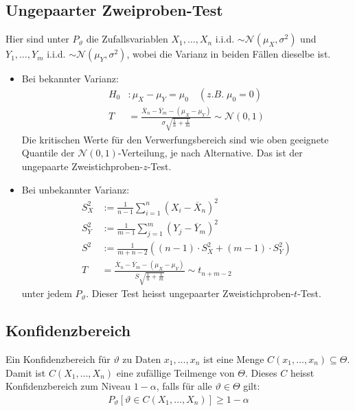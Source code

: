 \documentclass[8pt]{extarticle}
\newcommand{\vt}{\vartheta}
\newcommand{\Sn}{\sum_{i = 1}^n}
\newcommand{\zufallsvariablen}{X_1, \dots, X_n}
\newcommand{\Standardnormalverteilt}{\mathcal{N}  (0, 1)}
\begin{document}
\begin{multicols*}{3}
  \subsection*{Ungepaarter Zweiproben-Test}
  Hier sind unter $P_\vt$ die Zufallsvariablen $\zufallsvariablen$ i.i.d. $\sim
    \mathcal{N} (\mu_X, \sigma^2)$ und $Y_1, \dots, Y_m$ i.i.d. $\sim
    \mathcal{N} (\mu_Y, \sigma^2)$, wobei die Varianz in beiden Fällen dieselbe ist.
  \begin{itemize}
    \item Bei bekannter Varianz:
          \begin{align*}
            H_0 & : \mu_X - \mu_Y = \mu_0 \quad  (z.B. \; \mu_0 = 0)                                                                                \\
            T   & = \frac{\overline{X}_n - \overline{Y}_m -  (\mu_X - \mu_Y)}{\sigma \sqrt{\frac{1}{n} + \frac{1}{m}}} \sim \Standardnormalverteilt
          \end{align*}
          Die kritischen Werte für den Verwerfungsbereich sind wie oben
          geeignete Quantile der $\Standardnormalverteilt$-Verteilung, je nach
          Alternative. Das ist der ungepaarte Zweistichproben-$z$-Test.

    \item Bei unbekannter Varianz:
          \begin{align*}
            S_X^2 & := \frac{1}{n-1} \Sn  (X_i - \overline{X}_n)^2                                                                 \\
            S_Y^2 & := \frac{1}{m-1} \sum_{j = 1}^m  (Y_j - \overline{Y}_m)^2                                                      \\
            S^2   & := \frac{1}{m+n-2} \left(  (n-1) \cdot S_X^2 +  (m-1) \cdot S_Y^2 \right)                                       \\
            T     & = \frac{\overline{X}_n - \overline{Y}_m -  (\mu_X - \mu_Y)}{S \sqrt{\frac{1}{n} + \frac{1}{m}}} \sim t_{n+m-2}
          \end{align*}
          unter jedem $P_\vt$. Dieser Test heisst ungepaarter Zweistichproben-$t$-Test.
  \end{itemize}
  \subsection*{Konfidenzbereich}
  Ein Konfidenzbereich für $\vt$ zu Daten $x_1, \dots, x_n$ ist eine Menge
  $C (x_1, \dots, x_n) \subseteq \varTheta$. Damit ist $C (\zufallsvariablen)$ eine
  zufällige Teilmenge von $\varTheta$. Dieses $C$ heisst Konfidenzbereich zum
  Niveau $1 - \alpha$, falls für alle $\vt \in \varTheta$ gilt:
  \begin{align*}
    P_\vt [\vt \in C (\zufallsvariablen)] \geq 1 - \alpha
  \end{align*}

\end{multicols*}
\end{document}
